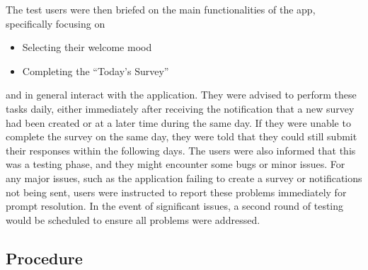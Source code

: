 \noindent The test users were then briefed on the main functionalities of the app, specifically focusing on
\begin{itemize}
    \item Selecting their welcome mood
    \item Completing the ``Today's Survey''
\end{itemize}
\noindent and in general interact with the application. They were advised to perform these tasks daily, either immediately after receiving the notification that a new survey had been created or at a later time during the same day. If they were unable to complete the survey on the same day, they were told that they could still submit their responses within the following days. The users were also informed that this was a testing phase, and they might encounter some bugs or minor issues. For any major issues, such as the application failing to create a survey or notifications not being sent, users were instructed to report these problems immediately for prompt resolution. In the event of significant issues, a second round of testing would be scheduled to ensure all problems were addressed.

\subsection{Procedure}

